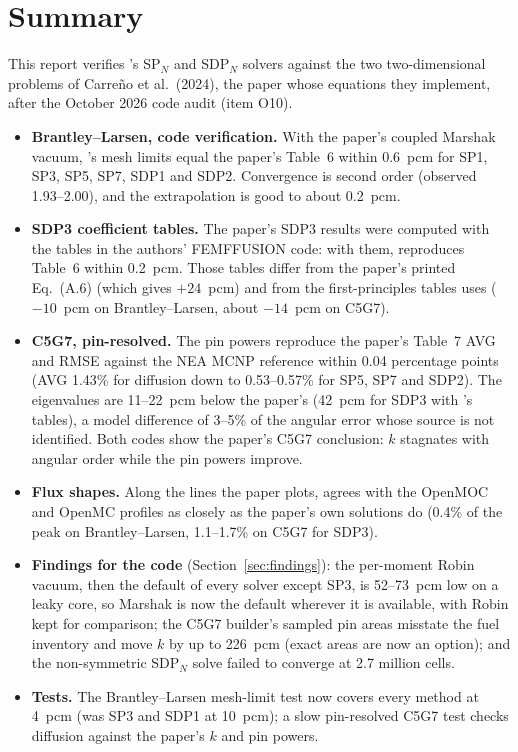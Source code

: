 \section*{Summary}

This report verifies \garnet's SP$_N$ and SDP$_N$ solvers against the two
two-dimensional problems of Carre\~no et al.\ (2024), the paper whose
equations they implement, after the October 2026 code audit (item O10).

\begin{itemize}
\item \textbf{Brantley--Larsen, code verification.} With the paper's coupled
  Marshak vacuum, \garnet's mesh limits equal the paper's Table~6 within
  0.6~pcm for SP1, SP3, SP5, SP7, SDP1 and SDP2. Convergence is second order
  (observed 1.93--2.00), and the extrapolation is good to about 0.2~pcm.
\item \textbf{SDP3 coefficient tables.} The paper's SDP3 results were
  computed with the tables in the authors' FEMFFUSION code: with them,
  \garnet{} reproduces Table~6 within 0.2~pcm. Those tables differ from the
  paper's printed Eq.~(A.6) (which gives $+24$~pcm) and from the
  first-principles tables \garnet{} uses ($-10$~pcm on Brantley--Larsen,
  about $-14$~pcm on C5G7).
\item \textbf{C5G7, pin-resolved.} The pin powers reproduce the paper's
  Table~7 AVG and RMSE against the NEA MCNP reference within 0.04
  percentage points (AVG 1.43\% for diffusion down to 0.53--0.57\% for SP5,
  SP7 and SDP2). The eigenvalues are 11--22~pcm below the paper's (42~pcm
  for SDP3 with \garnet's tables), a model difference of 3--5\% of the
  angular error whose source is not identified. Both codes
  show the paper's C5G7 conclusion: $k$ stagnates with angular order while
  the pin powers improve.
\item \textbf{Flux shapes.} Along the lines the paper plots, \garnet{} agrees
  with the OpenMOC and OpenMC profiles as closely as the paper's own
  solutions do (0.4\% of the peak on Brantley--Larsen, 1.1--1.7\% on C5G7
  for SDP3).
\item \textbf{Findings for the code} (Section~\ref{sec:findings}): the
  per-moment Robin vacuum, then the default of every solver except SP3, is
  52--73~pcm low on a leaky core, so Marshak is now the default wherever it is
  available, with Robin kept for comparison; the C5G7 builder's sampled pin
  areas misstate the fuel inventory and move $k$ by up to 226~pcm (exact areas
  are now an option); and the non-symmetric SDP$_N$ solve failed to converge
  at 2.7 million cells.
\item \textbf{Tests.} The Brantley--Larsen mesh-limit test now covers every
  method at 4~pcm (was SP3 and SDP1 at 10~pcm); a slow pin-resolved C5G7
  test checks diffusion against the paper's $k$ and pin powers.
\end{itemize}
